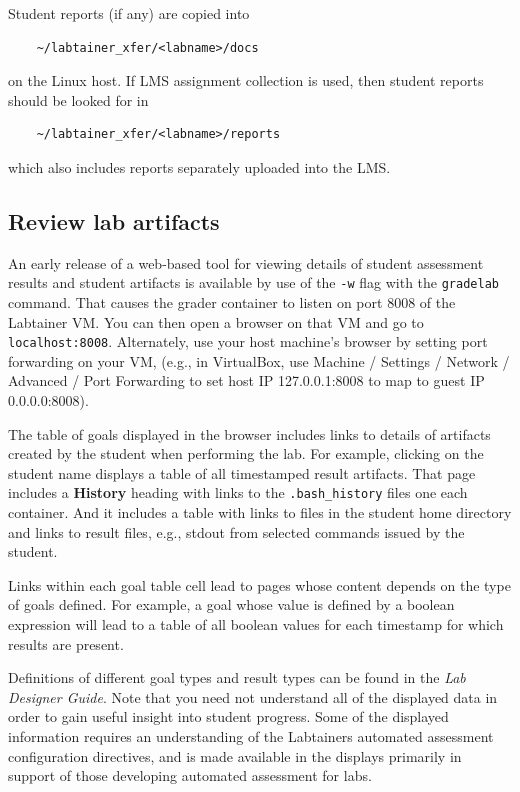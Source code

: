 \documentclass[12pt]{article}
\begin{document}
Student reports (if any) are  copied into 
\begin{verbatim}
    ~/labtainer_xfer/<labname>/docs
\end{verbatim}
\noindent on the Linux host.  If LMS assignment collection is used, then student reports should
be looked for in 
\begin{verbatim}
    ~/labtainer_xfer/<labname>/reports
\end{verbatim}
\noindent which also includes reports separately uploaded into the LMS.

\subsection{Review lab artifacts}
\label{review-artifacts}
An early release of a web-based tool for viewing details of student assessment
results and student artifacts is available by use of the {\tt -w} flag with the {\tt gradelab} command.  That causes
the grader container to listen on port 8008 of the Labtainer VM.  You can then open
a browser on that VM and go to {\tt localhost:8008}.  Alternately, use your host machine's browser
by setting port forwarding on your VM, (e.g., in VirtualBox, use Machine / Settings / Network / Advanced /
Port Forwarding to set host IP 127.0.0.1:8008 to map to guest IP 0.0.0.0:8008).

The table of goals displayed in the browser includes links to details of artifacts
created by the student when performing the lab.  For example, clicking on the student name displays a table
of all timestamped result artifacts.  That page includes a \textbf{History} heading with links to the
{\tt .bash\_history} files one each container.  And it includes a table with links to files in the student home directory
and links to result files, e.g., stdout from selected commands issued by the student. 

Links within each goal table cell lead to pages whose content depends on the type of goals defined.  For example,
a goal whose value is defined by a boolean expression will lead to a table of all boolean values for each timestamp
for which results are present.

Definitions of different goal types and result types can be found in the \textit{Lab Designer Guide}.  Note that you need
not understand all of the displayed data in order to gain useful insight into student progress.  Some of the displayed information
requires an understanding of the Labtainers automated assessment configuration directives, and is made available in the displays 
primarily in support of those developing automated assessment for labs.
\end{document}
